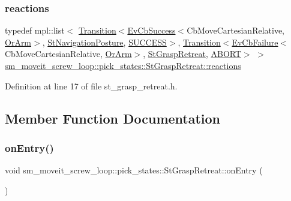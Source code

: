 \subsubsection{\texorpdfstring{reactions}{reactions}}
{\footnotesize\ttfamily typedef mpl\+::list$<$ \hyperlink{classsmacc_1_1Transition}{Transition}$<$\hyperlink{structsmacc_1_1EvCbSuccess}{Ev\+Cb\+Success}$<$Cb\+Move\+Cartesian\+Relative, \hyperlink{classsm__moveit__screw__loop_1_1OrArm}{Or\+Arm}$>$, \hyperlink{structsm__moveit__screw__loop_1_1pick__states_1_1StNavigationPosture}{St\+Navigation\+Posture}, \hyperlink{structsmacc_1_1default__transition__tags_1_1SUCCESS}{S\+U\+C\+C\+E\+SS}$>$, \hyperlink{classsmacc_1_1Transition}{Transition}$<$\hyperlink{structsmacc_1_1EvCbFailure}{Ev\+Cb\+Failure}$<$Cb\+Move\+Cartesian\+Relative, \hyperlink{classsm__moveit__screw__loop_1_1OrArm}{Or\+Arm}$>$, \hyperlink{structsm__moveit__screw__loop_1_1pick__states_1_1StGraspRetreat}{St\+Grasp\+Retreat}, \hyperlink{structsmacc_1_1default__transition__tags_1_1ABORT}{A\+B\+O\+RT}$>$ $>$ \hyperlink{structsm__moveit__screw__loop_1_1pick__states_1_1StGraspRetreat_a53aef096927d0b4449e87ba0fb6aa240}{sm\+\_\+moveit\+\_\+screw\+\_\+loop\+::pick\+\_\+states\+::\+St\+Grasp\+Retreat\+::reactions}}



Definition at line 17 of file st\+\_\+grasp\+\_\+retreat.\+h.



\subsection{Member Function Documentation}
\mbox{\label{structsm__moveit__screw__loop_1_1pick__states_1_1StGraspRetreat_aa4828fe3f773708c6450ba2581473c88}} 
\subsubsection{\texorpdfstring{on\+Entry()}{onEntry()}}
{\footnotesize\ttfamily void sm\+\_\+moveit\+\_\+screw\+\_\+loop\+::pick\+\_\+states\+::\+St\+Grasp\+Retreat\+::on\+Entry (\begin{DoxyParamCaption}{ }\end{DoxyParamCaption})\hspace{0.3cm}{\ttfamily [inline]}}




